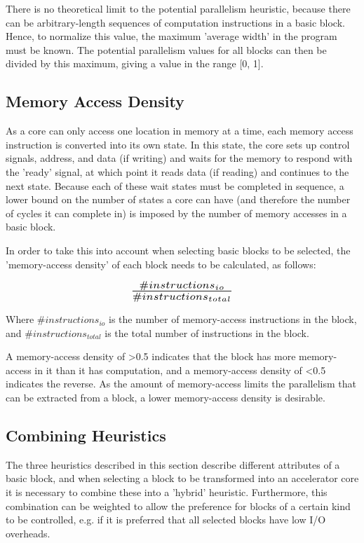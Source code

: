 \documentclass{UoYCSproject}
\begin{document}
There is no theoretical limit to the potential parallelism heuristic, because there can be arbitrary-length sequences of
computation instructions in a basic block. Hence, to normalize this value, the maximum 'average width' in the program must be
known. The potential parallelism values for all blocks can then be divided by this maximum, giving a value in the range [0, 1].

\subsection{Memory Access Density}

As a core can only access one location in memory at a time, each memory access instruction is converted into its own state.
In this state, the core sets up control signals, address, and data (if writing) and waits for the memory to respond
with the 'ready' signal, at which point it reads data (if reading) and continues to the next state. Because each of these
wait states must be completed in sequence, a lower bound on the number of states a core can have (and therefore the number
of cycles it can complete in) is imposed by the number of memory accesses in a basic block.

In order to take this into account when selecting basic blocks to be selected, the 'memory-access density' of each block needs
to be calculated, as follows:

\begin{equation}
\scalebox{1.5}{$\frac{\#instructions_{io}}{\#instructions_{total}}$}
\end{equation}

Where \(\#instructions_{io}\) is the number of memory-access instructions in the block, and \(\#instructions_{total}\) is the
total number of instructions in the block.

A memory-access density of >0.5 indicates that the block has more memory-access in it than it has computation, and a memory-access
density of <0.5 indicates the reverse. As the amount of memory-access limits the parallelism that can be extracted from a block,
a lower memory-access density is desirable.

\subsection{Combining Heuristics}

The three heuristics described in this section describe different attributes of a basic block, and when selecting a block
to be transformed into an accelerator core it is necessary to combine these into a 'hybrid' heuristic. Furthermore,
this combination can be weighted to allow the preference for blocks of a certain kind to be controlled, e.g. if it is preferred
that all selected blocks have low I/O overheads.
\end{document}
